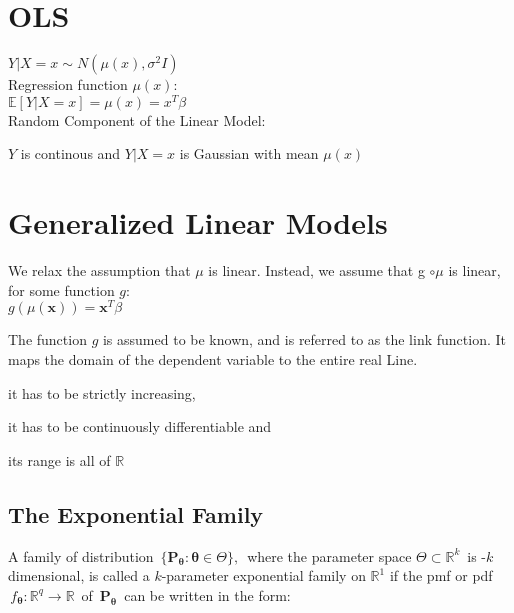 \section{OLS}

$Y|X=x \sim N(\mu(x),\sigma^2 I)$\\

Regression function $\mu(x)$:\\

$\mathbb{E}[Y|X=x]=\mu(x) = x^T\beta$\\

Random Component of the Linear Model:

$Y$ is continous and $Y|X=x$ is Gaussian with mean $\mu(x)$


\section{Generalized Linear Models}
We relax the assumption that $\mu$ is linear. Instead, we assume that g $\circ \mu$ is linear, for some function $g$:\\

$g(\mu (\mathbf x)) = \mathbf x^ T \beta$

The function $g$ is assumed to be known, and is referred to as the link function. It maps the domain of the dependent variable to the entire real Line.

it has to be strictly increasing,

it has to be continuously differentiable and

its range is all of $\mathbb{R}$


\subsection{The Exponential Family}

A family of distribution $\, \{ \mathbf{P}_{{\boldsymbol \theta }}: {\boldsymbol \theta }\in \Theta \} ,\,$  where the parameter space $\Theta \subset \mathbb {R}^ k\,$ is -$k$ dimensional, is called a $k$-parameter exponential family on $\mathbb{R}^1$ if the pmf or pdf $\, f_{\boldsymbol \theta }:\mathbb {R}^ q\to \mathbb {R}\,$ of $\, \mathbf{P}_{{\boldsymbol \theta }}\,$ can be written in the form:\\

